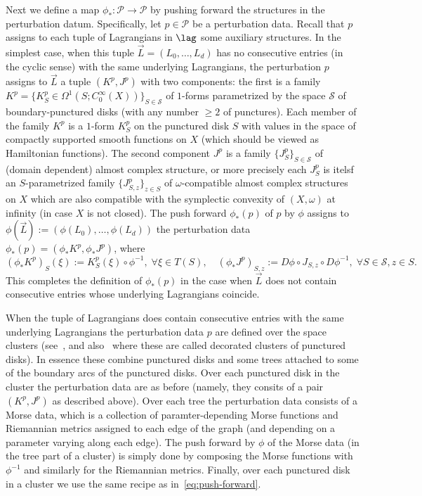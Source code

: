 Next we define a map
$\phi_* : \mathcal{P} \longrightarrow \mathcal{P}$ by pushing forward
the structures in the perturbation datum. Specifically, let
$p \in \mathcal{P}$ be a perturbation data. Recall that $p$ assigns to
each tuple of Lagrangians in $\lag$ some auxiliary structures.  In the
simplest case, when this tuple $\vec{L} = (L_0, \ldots, L_d)$ has no
consecutive entries (in the cyclic sense) with the same underlying
Lagrangians, the perturbation $p$ assigns to $\vec{L}$ a tuple
$(K^p, J^p)$ with two components: the first is a family
$K^p =\{K^p_S \in \Omega^1(S; C_0^{\infty}(X))\}_{S \in \mathcal{S}}$
of $1$-forms parametrized by the space $\mathcal{S}$ of
boundary-punctured disks (with any number $\geq 2$ of punctures). Each
member of the family $K^p$ is a $1$-form $K_S^p$ on the punctured disk
$S$ with values in the space of compactly supported smooth functions
on $X$ (which should be viewed as Hamiltonian functions). The second
component $J^p$ is a family $\{J_S^p\}_{S \in \mathcal{S}}$ of (domain
dependent) almost complex structure, or more precisely each $J^p_S$ is
itelsf an $S$-parametrized family $\{J^p_{S,z}\}_{z \in S}$ of
$\omega$-compatible almost complex structures on $X$ which are also
compatible with the symplectic convexity of $(X, \omega)$ at infinity
(in case $X$ is not closed).  The push forward $\phi_*(p)$ of $p$ by
$\phi$ assigns to $\phi(\vec{L}) := (\phi(L_0), \ldots, \phi(L_d))$
the perturbation data $\phi_*(p) = (\phi_* K^p, \phi_* J^p)$, where
\begin{equation} \label{eq:push-forward}
  (\phi_*K^p)_S (\xi) :=  K^p_S(\xi) \circ \phi^{-1}, \; \forall
  \xi \in T(S), \quad (\phi_* J^p)_{S,z} := D \phi \circ J_{S,z}
  \circ D \phi^{-1}, \; \forall S \in \mathcal{S}, z \in S.
\end{equation}
This completes the definition of $\phi_*(p)$ in the case when
$\vec{L}$ does not contain consecutive entries whose underlying
Lagrangians coincide.

When the tuple of Lagrangians does contain consecutive entries with
the same underlying Lagrangians the perturbation data $p$ are defined
over the space clusters (see~\cite{Amb:fil-fuk}, and
also~\cite[Section~3.3]{BCZ:tpc} where these are called decorated
clusters of punctured disks). In essence these combine punctured disks
and some trees attached to some of the boundary arcs of the punctured
disks. Over each punctured disk in the cluster the perturbation data
are as before (namely, they consits of a pair $(K^p,J^p)$ as described
above). Over each tree the perturbation data consists of a Morse data,
which is a collection of paramter-depending Morse functions and
Riemannian metrics assigned to each edge of the graph (and depending
on a parameter varying along each edge). The push forward by $\phi$
of the Morse data (in the tree part of a cluster) is simply done by
composing the Morse functions with $\phi^{-1}$ and similarly for the
Riemannian metrics. Finally, over each punctured disk in a cluster we
use the same recipe as in~\eqref{eq:push-forward}.

